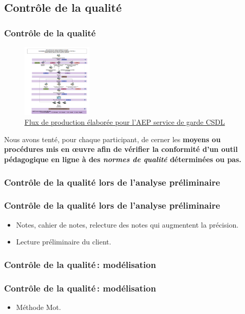 				\subsection{Contrôle de la qualité} 
						\begin{frame}[allowframebreaks]
						\frametitle{Contrôle de la qualité}
                        			\begin{figure}
                     			\centering
                    			 \includegraphics[width = 0.30\textwidth]{flux.png}
                     			\caption{\tiny{\href{run:flux.png}{Flux de production élaborée pour l'AEP service de garde CSDL}}}
                   			\end{figure}
                        			Nous avons tenté, pour chaque participant, de cerner les \textbf{moyens ou procédures mis en œuvre afin de vérifier la conformité d’un outil pédagogique en ligne à des \textit{normes de qualité} déterminées ou pas.}
						
						\end{frame}
						
					\subsubsection{Contrôle de la qualité lors de l'analyse préliminaire} 
							\begin{frame}
							\frametitle{Contrôle de la qualité lors de l'analyse préliminaire}
                        				
							\begin{itemize}
							
							\item Notes, cahier de notes, relecture des notes qui augmentent la précision.
							\item Lecture préliminaire du client. 
												
							\end{itemize}						
					\end{frame}	
					\subsubsection{Contrôle de la qualité\,: modélisation} 
							\begin{frame}[allowframebreaks]
							\frametitle{Contrôle de la qualité\,: modélisation}
                        			
							\begin{itemize}
							\item Méthode Mot.
							\end{itemize}						
					\end{frame}	
					
